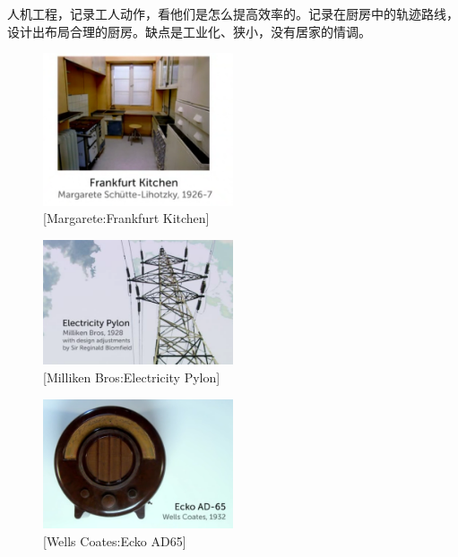 \documentclass[UTF8]{../../../../RepresentationUniverse}
\begin{document}
人机工程，记录工人动作，看他们是怎么提高效率的。记录在厨房中的轨迹路线，设计出布局合理的厨房。缺点是工业化、狭小，没有居家的情调。

\begin{figure}[h]
    \centering
    \includegraphics[width=0.5\textwidth]{./src/figures/Frankfurt Kitchen_2023-04-09_16-48-37.png}
    \caption{[Margarete:Frankfurt Kitchen]}
    \label{figure:Frankfurt Kitchen}
\end{figure}

\begin{figure}[h]
    \centering
    \includegraphics[width=0.5\textwidth]{./src/figures/Electricity Pylon_2023-04-09_19-18-02.png}
    \caption{[Milliken Bros:Electricity Pylon]}
    \label{figure:Electricity Pylon}
\end{figure}

\begin{figure}[h]
    \centering
    \includegraphics[width=0.5\textwidth]{./src/figures/Ecko AD65_2023-04-09_19-20-05.png}
    \caption{[Wells Coates:Ecko AD65]}
    \label{figure:Ecko AD65}
\end{figure}
\end{document}
